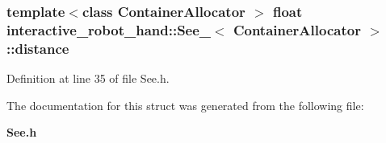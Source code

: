 \subsubsection[{distance}]{\setlength{\rightskip}{0pt plus 5cm}template$<$class Container\-Allocator $>$ float {\bf interactive\-\_\-robot\-\_\-hand\-::\-See\-\_\-}$<$ Container\-Allocator $>$\-::distance}\label{structinteractive__robot__hand_1_1See___a5b64a40730f18089f6f8a421102ae16e}


Definition at line 35 of file See.\-h.



The documentation for this struct was generated from the following file\-:\begin{DoxyCompactItemize}
\item 
{\bf See.\-h}\end{DoxyCompactItemize}
